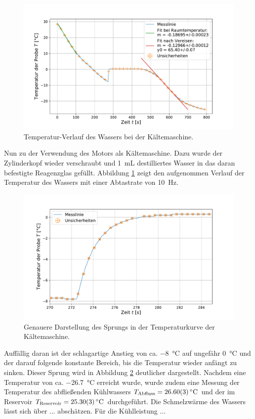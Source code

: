 	\begin{figure}[ht]
		\centering
		\includegraphics[width=\textwidth]{data/kalt_machen.pdf}
		\caption{Temperatur-Verlauf des Wassers bei der Kältemaschine.}
		\label{fig:Kältemaschine}	
	\end{figure}
	Nun zu der Verwendung des Motors als Kältemaschine.
	Dazu wurde der Zylinderkopf wieder verschraubt und \SI{1}{\milli\liter} destilliertes Wasser in das daran befestigte Reagenzglas gefüllt.
	Abbildung \ref{fig:Kältemaschine} zeigt den aufgenommen Verlauf der Temperatur des Wassers mit einer Abtastrate von \SI{10}{\hertz}.
	\begin{figure}[ht]
		\centering
		\includegraphics[width=\textwidth]{data/kalt_sprung.pdf}
		\caption{Genauere Darstellung des Sprungs in der Temperaturkurve der Kältemaschine.}
		\label{fig:KaltSprung}	
	\end{figure} 
	Auffällig daran ist der schlagartige Anstieg von ca. \SI{-8}{\celsius} auf ungefähr \SI{0}{\celsius} und der darauf folgende konstante Bereich, bis die Temperatur wieder anfängt zu sinken.
	Dieser Sprung wird in Abbildung \ref{fig:KaltSprung} deutlicher dargestellt.
	Nachdem eine Temperatur von ca. \SI{-26,7}{\celsius} erreicht wurde, wurde zudem eine Messung der Temperatur des abfließenden Kühlwassers $T_\text{Abfluss} = \SI{26,6+-0,03}{\celsius}$ und der im Reservoir $T_\text{Reservoir} = \SI{25,3+-0,03}{\celsius}$ durchgeführt.
	Die Schmelzwärme des Wassers lässt sich über ... abschätzen. %
	Für die Kühlleistung ...%
	
